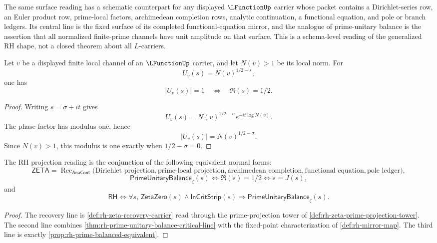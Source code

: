 \begin{remark}
\label{rem:rh-lfunction-generalization}
The same surface reading has a schematic counterpart for any displayed
$\LFunctionUp$ carrier whose packet contains a Dirichlet-series row, an Euler
product row, prime-local factors, archimedean completion rows, analytic
continuation, a functional equation, and pole or branch ledgers.  Its central
line is the fixed surface of its completed functional-equation mirror, and
the analogue of prime-unitary balance is the assertion that all normalized
finite-prime channels have unit amplitude on that surface.  This is a
schema-level reading of the generalized RH shape, not a closed theorem about
all $L$-carriers.
\end{remark}

\begin{proposition}
\label{prop:rh-norm-local-central-unit-surface}
Let $v$ be a displayed finite local channel of an $\LFunctionUp$ carrier, and
let $N(v)>1$ be its local norm.  For
$$
U_v(s)=N(v)^{1/2-s},
$$
one has
$$
\left|U_v(s)\right|=1
\quad\Longleftrightarrow\quad
\Re(s)=1/2.
$$
\end{proposition}

\begin{proof}
Writing $s=\sigma+it$ gives
$$
U_v(s)=N(v)^{1/2-\sigma}e^{-it\log N(v)}.
$$
The phase factor has modulus one, hence
$$
\left|U_v(s)\right|=N(v)^{1/2-\sigma}.
$$
Since $N(v)>1$, this modulus is one exactly when $1/2-\sigma=0$.
\end{proof}

\begin{theorem}
\label{thm:rh-prime-local-projection-normal-form}
The RH projection reading is the conjunction of the following equivalent
normal forms:
$$
\mathsf{ZETA}
=
\operatorname{Rec}_{\mathsf{AnaCont}}
\bigl(
\text{Dirichlet projection},
\text{prime-local projection},
\text{archimedean completion},
\text{functional equation},
\text{pole ledger}
\bigr),
$$
$$
\mathsf{PrimeUnitaryBalance}_{\zeta}(s)
\Longleftrightarrow
\Re(s)=1/2
\Longleftrightarrow
s=J(s),
$$
and
$$
\mathsf{RH}
\Longleftrightarrow
\forall s,\,
\mathsf{ZetaZero}(s)\wedge\mathsf{InCritStrip}(s)
\Longrightarrow
\mathsf{PrimeUnitaryBalance}_{\zeta}(s).
$$
\end{theorem}

\begin{proof}
The recovery line is \autoref{def:rh-zeta-recovery-carrier} read through the
prime-projection tower of \autoref{def:rh-zeta-prime-projection-tower}.  The
second line combines \autoref{thm:rh-prime-unitary-balance-critical-line} with
the fixed-point characterization of \autoref{def:rh-mirror-map}.  The third
line is exactly \autoref{prop:rh-prime-balanced-equivalent}.
\end{proof}


